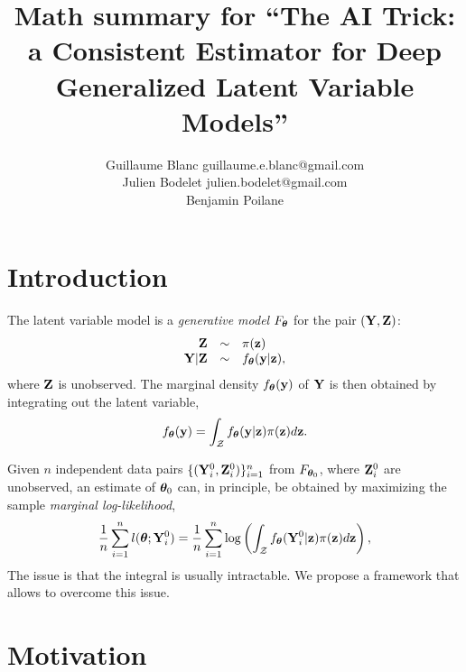 \documentclass[twoside,11pt]{article}
\begin{document}
\title{Math summary for 
``The AI Trick: a Consistent Estimator for Deep Generalized Latent Variable Models''
}

\author{\name Guillaume Blanc \email guillaume.e.blanc@gmail.com \\
  \AND
  \name Julien Bodelet \email julien.bodelet@gmail.com \\
  \AND
  \name Benjamin Poilane \email 
}


\maketitle


\section{Introduction}

The latent variable model is a \textit{generative model} $F_{\bm{\theta}}$ for the pair $({\bf Y}, {\bf Z})$:
%
\begin{align}
    \begin{matrix}
        \hfill\Z &\sim& \pi(\z)\hfill\\
        \hfill\Y|\Z &\sim& f_\bt(\y|\z)\hfill,
    \end{matrix}
    \label{eqn:generative-model-general}
\end{align}
%
where ${\bf Z}$ is unobserved.
% 
The marginal density $f_{\bm{\theta}}({\bf y})$ of ${\bf Y}$ is then obtained by integrating out the latent variable, 
%
\begin{equation}
    f_{\bm{\theta}}({\bf y}) = \int_{\mathcal Z} f_{\bm{\theta}}({\bf y}|{\bf z})\pi({\bf z})d{\bf z}.
\end{equation}


Given $n$ independent data pairs $\{({\bf Y}_i^0, {\bf Z}_i^0)\}_{i=1}^n$ from $F_{{\bm{\theta}}_0}$, where ${\bf Z}_i^0$ are unobserved, an estimate of ${\bm{\theta}}_0$ can, in principle, be obtained by maximizing the sample \textit{marginal log-likelihood}, 
%
\begin{equation}
\frac{1}{n}\sum_{i=1}^n l({\bm{\theta}}; {\bf Y}_{i}^0)= \frac{1}{n}\sum_{i=1}^n \log\left(\int_{\mathcal Z}f_{\bm{\theta}}({\bf Y}_{i}^0|{\bf z})\pi({\bf z})d{\bf z}\right),
    \label{eqn:marginal-likelihood}
\end{equation}
The issue is that the integral is usually intractable.
We propose a framework that allows to overcome this issue.




\section{Motivation}
\end{document}
